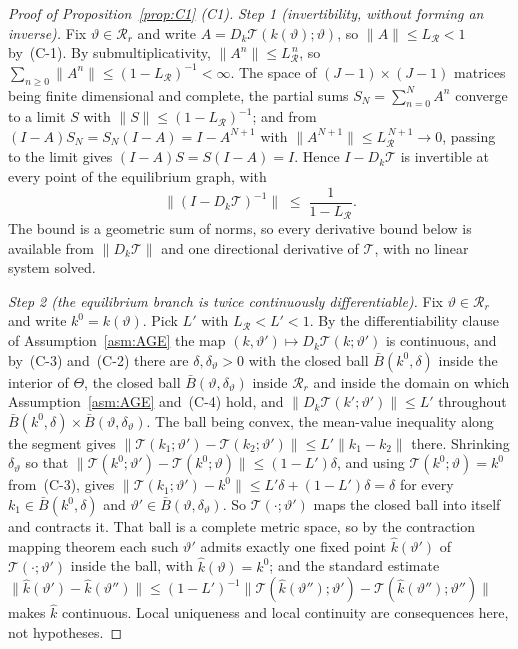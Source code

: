 \documentclass[11pt]{article}
\newcommand{\Tmap}{\mathcal{T}}
\begin{document}
\begin{proof}[Proof of Proposition~\ref{prop:C1} (C1)]
\emph{Step 1 (invertibility, without forming an inverse).} Fix $\vartheta\in\mathcal R_r$ and write
$A = D_k\Tmap(k(\vartheta);\vartheta)$, so $\lVert A\rVert \le L_{\mathcal R} < 1$ by~(C-1). By
submultiplicativity, $\lVert A^n\rVert \le L_{\mathcal R}^{\,n}$, so
$\sum_{n\ge0}\lVert A^n\rVert \le (1-L_{\mathcal R})^{-1} < \infty$. The space of
$(J-1)\times(J-1)$ matrices being finite dimensional and complete, the partial sums
$S_N = \sum_{n=0}^{N}A^n$ converge to a limit $S$ with
$\lVert S\rVert \le (1-L_{\mathcal R})^{-1}$; and from $(I-A)S_N = S_N(I-A) = I - A^{N+1}$ with
$\lVert A^{N+1}\rVert \le L_{\mathcal R}^{\,N+1} \to 0$, passing to the limit gives
$(I-A)S = S(I-A) = I$. Hence $I - D_k\Tmap$ is invertible at every point of the equilibrium graph,
with
\begin{equation}
\label{eq:C1-neumann}
\bigl\lVert (I-D_k\Tmap)^{-1} \bigr\rVert \;\le\; \frac{1}{1-L_{\mathcal R}} .
\end{equation}
The bound is a geometric sum of norms, so every derivative bound below is available from
$\lVert D_k\Tmap\rVert$ and one directional derivative of $\Tmap$, with no linear system solved.

\emph{Step 2 (the equilibrium branch is twice continuously differentiable).} Fix
$\vartheta\in\mathcal R_r$ and write $k^0 = k(\vartheta)$. Pick $L'$ with
$L_{\mathcal R} < L' < 1$. By the differentiability clause of Assumption~\ref{asm:AGE} the map
$(k,\vartheta')\mapsto D_k\Tmap(k;\vartheta')$ is continuous, and by~(C-3) and~(C-2) there are
$\delta,\delta_\vartheta > 0$ with the closed ball $\bar B(k^0,\delta)$ inside the interior of $\Theta$, the
closed ball $\bar B(\vartheta,\delta_\vartheta)$ inside $\mathcal R_r$ and inside the domain on which
Assumption~\ref{asm:AGE} and~(C-4) hold, and $\lVert D_k\Tmap(k';\vartheta')\rVert \le L'$
throughout $\bar B(k^0,\delta)\times\bar B(\vartheta,\delta_\vartheta)$. The ball being convex, the
mean-value inequality along the segment gives
$\lVert \Tmap(k_1;\vartheta') - \Tmap(k_2;\vartheta')\rVert \le L'\lVert k_1-k_2\rVert$ there.
Shrinking $\delta_\vartheta$ so that
$\lVert \Tmap(k^0;\vartheta') - \Tmap(k^0;\vartheta)\rVert \le (1-L')\delta$, and using
$\Tmap(k^0;\vartheta) = k^0$ from~(C-3), gives
$\lVert \Tmap(k_1;\vartheta') - k^0\rVert \le L'\delta + (1-L')\delta = \delta$ for every
$k_1\in\bar B(k^0,\delta)$ and $\vartheta'\in\bar B(\vartheta,\delta_\vartheta)$. So
$\Tmap(\cdot;\vartheta')$ maps the closed ball into itself and contracts it. That ball is a complete
metric space, so by the contraction mapping theorem each such $\vartheta'$ admits exactly one fixed
point $\hat k(\vartheta')$ of $\Tmap(\cdot;\vartheta')$ inside the ball, with
$\hat k(\vartheta) = k^0$; and the standard estimate
$\lVert\hat k(\vartheta')-\hat k(\vartheta'')\rVert \le (1-L')^{-1}\lVert
\Tmap(\hat k(\vartheta'');\vartheta') - \Tmap(\hat k(\vartheta'');\vartheta'')\rVert$ makes
$\hat k$ continuous. Local uniqueness and local continuity are consequences here, not hypotheses.


\end{proof}
\end{document}
